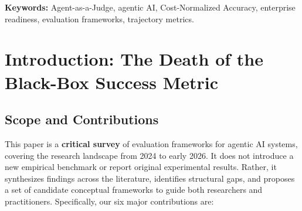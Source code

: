 \documentclass[11pt]{article}
\newcommand{\keywords}[1]{\par\noindent\textbf{Keywords:} #1}
\begin{document}
\keywords{Agent-as-a-Judge, agentic AI, Cost-Normalized Accuracy, enterprise readiness, evaluation frameworks, trajectory metrics.}

\section{Introduction: The Death of the Black-Box Success Metric}
\label{sec:intro}

\subsection{Scope and Contributions}

This paper is a \textbf{critical survey} of evaluation frameworks for agentic AI systems, covering the research landscape from 2024 to early 2026. It does not introduce a new empirical benchmark or report original experimental results. Rather, it synthesizes findings across the literature, identifies structural gaps, and proposes a set of candidate conceptual frameworks to guide both researchers and practitioners. Specifically, our six major contributions are:
\end{document}
